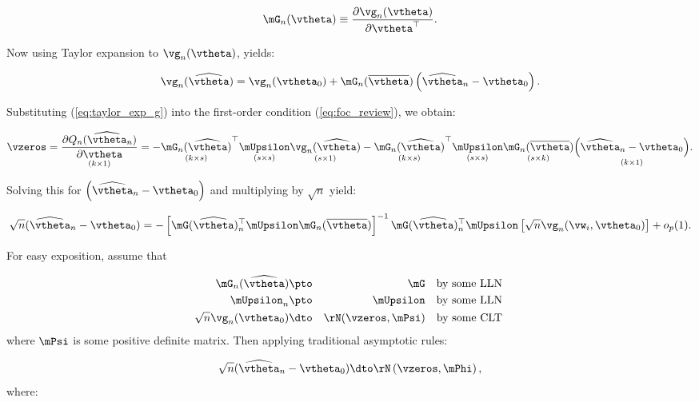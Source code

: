 \documentclass[english,12pt]{book}\usepackage[]{graphicx}\usepackage[]{xcolor}
\begin{document}
\begin{equation*}
  \mG_n(\vtheta) \equiv  \frac{\partial \vg_n(\vtheta)}{\partial \vtheta^\top}.
\end{equation*}

Now using Taylor expansion to $\vg_n(\vtheta)$, yields:

\begin{equation}\label{eq:taylor_exp_g}
  \vg_n(\widehat{\vtheta}) = \vg_n(\vtheta_0) + \mG_n(\overline{\vtheta})\left(\widehat{\vtheta}_n - \vtheta_0\right).
\end{equation}

Substituting (\ref{eq:taylor_exp_g}) into the first-order condition (\ref{eq:foc_review}), we obtain:

\begin{equation*}
  \vzeros = \underset{(k\times 1)}{\frac{\partial Q_n(\widehat{\vtheta}_n)}{\partial \vtheta}} = - \underset{(k\times s)}{\mG_n(\widehat{\vtheta})}^\top\underset{(s\times s)}{\mUpsilon}\underset{(s\times 1)}{\vg_n(\widehat{\vtheta})} - \underset{(k\times s)}{\mG_n(\widehat{\vtheta})}^\top\underset{(s\times s)}{\mUpsilon}\underset{(s\times k)}{\mG_n(\overline{\vtheta})}\underset{(k\times 1)}{\left(\widehat{\vtheta}_n - \vtheta_0\right)}.
\end{equation*}

Solving this for $\left(\widehat{\vtheta}_n - \vtheta_0\right)$ and multiplying by $\sqrt{n}$ yield:

\begin{equation*}
\sqrt{n}(\widehat{\vtheta}_n - \vtheta_0) = - \left[\mG(\widehat{\vtheta})_n^\top\mUpsilon\mG_n(\overline{\vtheta})\right]^{-1}\mG(\widehat{\vtheta})^\top_n\mUpsilon\left[\sqrt{n}\vg_n(\vw_i, \vtheta_0)\right] + o_p(1).
\end{equation*}

For easy exposition, assume that 

\begin{eqnarray}
 \mG_n(\widehat{\vtheta})& \pto & \mG \quad \mbox{by some LLN }\\
 \mUpsilon_n &\pto & \mUpsilon\quad \mbox{by some LLN } \\
 \sqrt{n}\vg_n(\vtheta_0)& \dto & \rN(\vzeros, \mPsi) \quad \mbox{by some CLT } \label{eq:asymptotic_distr_moment}
\end{eqnarray}
%
where $\mPsi$ is some positive definite matrix. Then applying traditional asymptotic rules:

\begin{equation*}
\sqrt{n}(\widehat{\vtheta}_n - \vtheta_0)\dto \rN\left(\vzeros, \mPhi\right),
\end{equation*}
%
where:
\end{document}
